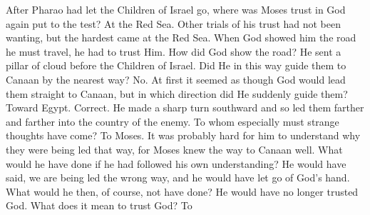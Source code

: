 After Pharao had let the Children of Israel go, where was Moses trust in God again put to the test? At the Red Sea. Other trials of his trust had not been wanting, but the hardest came at the Red Sea. When God showed him the road he must travel, he had to trust Him. How did God show the road? He sent a pillar of cloud before the Children of Israel. Did He in this way guide them to Canaan by the nearest way? No. At first it seemed as though God would lead them straight to Canaan, but in which direction did He suddenly guide them? Toward Egypt. Correct. He made a sharp turn southward and so led them farther and farther into the country of the enemy. To whom especially must strange thoughts have come? To Moses. It was probably hard for him to understand why they were being led that way, for Moses knew the way to Canaan well. What would he have done if he had followed his own understanding? He would have said, we are being led the wrong way, and he would have let go of God’s hand. What would he then, of course, not have done? He would have no longer trusted God. What does it mean to trust God? To

